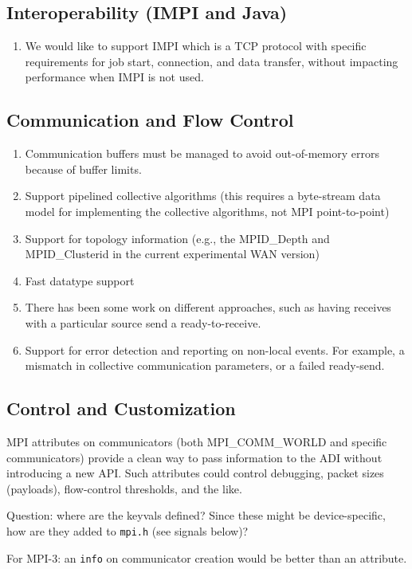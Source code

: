 \documentclass{article}
\let\file=\texttt
\let\code=\texttt
\begin{document}
\subsection{Interoperability (IMPI and Java)}
\begin{enumerate}
\item We would like to support IMPI which is a TCP protocol with specific
  requirements for job start, connection, and data transfer, without impacting
  performance when IMPI is not used.
\end{enumerate}

\subsection{Communication and Flow Control}
\begin{enumerate}
\item Communication buffers must be managed to avoid out-of-memory errors
  because of buffer limits.
\item Support pipelined collective algorithms (this requires a byte-stream
  data model for implementing the collective algorithms, not MPI
  point-to-point) 
\item Support for topology information (e.g., the MPID\_Depth and
  MPID\_Clusterid in the current experimental WAN version)
\item Fast datatype support
\item There has been some work on different approaches, such as having
  receives with a particular source send a ready-to-receive.
\item Support for error detection and reporting on non-local events.  For
  example, a mismatch in collective communication parameters, or a failed
  ready-send. 
\end{enumerate}

\subsection{Control and Customization}
MPI attributes on communicators (both MPI\_COMM\_WORLD and specific
communicators) provide a clean way to pass information to the ADI without
introducing a new API.  Such attributes could control debugging, packet sizes
(payloads), flow-control thresholds, and the like.

Question: where are the keyvals defined?  Since these might be
device-specific, how are they added to \file{mpi.h} (see signals below)?  

For MPI-3: an \code{info} on communicator creation would be better than an
attribute. 
\end{document}
